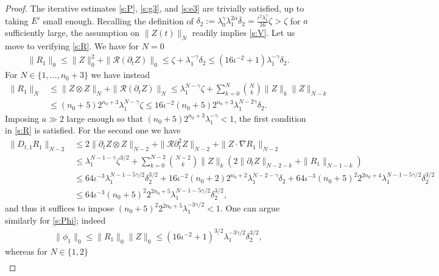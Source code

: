 \documentclass[10pt,a4paper]{amsart}
\numberwithin{equation}{section}
\numberwithin{corollario}{section}
\numberwithin{lemma}{section}
\numberwithin{prop}{section}
\theoremstyle{definition}
\theoremstyle{remark}
\begin{document}
\begin{proof}
The iterative estimates \eqref{s:P}, \eqref{s:g3}, and \eqref{s:e3} are trivially satisfied, up to taking $E'$ small enough. 
Recalling the definition of $\delta_2 := \lambda_0^\gamma \lambda_1^{2\alpha} \overline{\delta}_2 = \frac{\iota^2 \lambda_1^\gamma}{16} \zeta > \zeta$ for $a$ sufficiently large, the assumption on $\| Z(t) \|_{N}$ readily implies \eqref{s:V}.
Let us move to verifying \eqref{s:R}. We have for $N=0$
\begin{align}
    \| R_1\|_0 \leq \| Z \|_0^2 + \| \mathcal{R}(\partial_t Z) \|_0 
    \leq
    \zeta + \lambda_1^{-\gamma}\delta_2
    \leq
    (16\iota^{-2}+1)\lambda_1^{-\gamma}\delta_2.
\end{align}
For $N \in \{1,\dots,n_0+3\}$ we have instead
\begin{align}
    \| R_1\|_N &\leq \| Z \otimes Z \|_N + \| \mathcal{R}(\partial_t Z) \|_N
    \leq 
    \lambda_1^{N-\gamma} \zeta + \sum_{k =0}^{N} \binom{N}{k} \| Z \|_k \|Z\|_{N-k}
    \\
    &\leq
    (n_0+5)2^{n_0+3}\lambda_1^{N-\gamma} \zeta
    \leq
    16\iota^{-2}(n_0+5)2^{n_0+3}\lambda_1^{N-2\gamma} \delta_2.
\end{align}
Imposing $a \gg 2$ large enough so that $(n_0+5)2^{n_0+3}\lambda_1^{-\gamma} < 1$, the first condition in \eqref{s:R} is satisfied.
For the second one we have
\begin{align}
\| D_{t,1} R_1 \|_{N-2}
&\leq
2\|\partial_t Z \otimes 
Z\|_{N-2}
+
\| \mathcal{R} \partial_t^2 Z \|_{N-2}
+
\| Z \cdot \nabla R_1 \|_{N-2}
\\
&\leq
\lambda_1^{N-1-\gamma} \zeta^{3/2} +\sum_{k=0}^{N-2} \binom{N-2}{k} \|Z\|_k (2\| \partial_t Z\|_{N-2-k}+\|R_1\|_{N-1-k})
\\
&\leq
64\iota^{-3}\lambda_1^{N-1-5\gamma/2} {\delta}_2^{3/2} 
+ 
16\iota^{-2}(n_0+2)2^{n_0+2} \lambda_1^{N-2-\gamma} {\delta}_2 
+ 
64\iota^{-3}(n_0+5)^2 2^{2n_0+4} \lambda_1^{N-1-5\gamma/2}{\delta}_2^{3/2} 
\\
&\leq
64\iota^{-3}(n_0+5)^2 2^{2n_0+5} \lambda_1^{N-1-5\gamma/2} {\delta}_2^{3/2},
\end{align}
and thus it suffices to impose $(n_0+5)^2 2^{2n_0+5} \lambda_1^{-3\gamma/2} < 1$. 
One can argue similarly for \eqref{s:Phi}; indeed
\begin{align}
  \| \phi_1 \|_0
    \leq  
\| R_1\|_0 \|Z\|_0 \leq
(16\iota^{-2}+1)^{3/2} \lambda_1^{-3\gamma/2} \delta_2^{3/2},
\end{align}
whereas for $N \in \{1,2\}$
\begin{align}

\end{align}
\end{proof}
\end{document}
